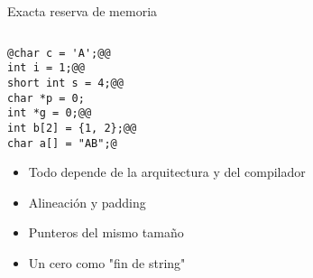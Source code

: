 \begin{frame}[fragile,label=RM]{Exacta reserva de memoria}
   \begin{columns}
      \begin{column}{.55\linewidth}
         \begin{lstlisting}[style=dimmided]
@char c = 'A';@@
int i = 1;@@
short int s = 4;@@
char *p = 0;
int *g = 0;@@
int b[2] = {1, 2};@@
char a[] = "AB";@
         \end{lstlisting}
   \begin{itemize}
      \item<1-> Todo depende de la arquitectura y del compilador
      \item<2-> Alineaci\'on y padding 
      \item<4-> Punteros del mismo tama\~no
      \item<6-> Un cero como "fin de string"
   \end{itemize}

      \end{column}
      \begin{column}{.05\linewidth}
      \end{column}
      \begin{column}{.30\linewidth}
         \begin{tikzpicture}[cell/.style={rectangle,draw=black},
            space/.style={minimum height=1.5em,matrix of nodes,row sep=-\pgflinewidth,column sep=-\pgflinewidth,column 1/.style={font=\ttfamily}},text depth=0.5ex,text height=2ex,nodes in empty cells]
            

\end{tikzpicture}
\end{column}
\end{columns}
\end{frame}
